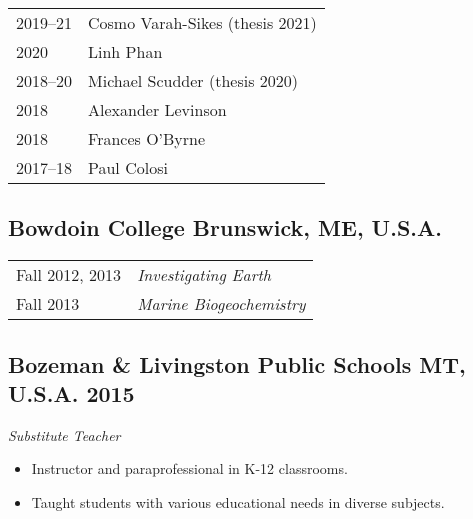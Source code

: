 \begin{tabular}{ll}
	2019--21 & Cosmo Varah-Sikes (thesis 2021)\\
	2020 & Linh Phan \\
	2018--20 & Michael Scudder (thesis 2020) \\
	2018 & Alexander Levinson \\
	2018 & Frances O'Byrne \\
	2017--18 & Paul Colosi
\end{tabular}

\subsection*{\textbf{Bowdoin College} \hspace{15pt} Brunswick, ME, U.S.A.}
\begin{tabular}{p{.15\linewidth} p{.85\linewidth}} %
Fall 2012, 2013 & \textit{Investigating Earth}\\
Fall 2013 & \textit{Marine Biogeochemistry}
\end{tabular}

\subsection*{\textbf{Bozeman \& Livingston Public Schools} \hspace{15pt} MT, U.S.A. \hfill 2015}
\textit{Substitute Teacher}
\begin{itemize}
	\item Instructor and paraprofessional in K-12 classrooms.
	\item Taught students with various educational needs in diverse subjects.
\end{itemize}